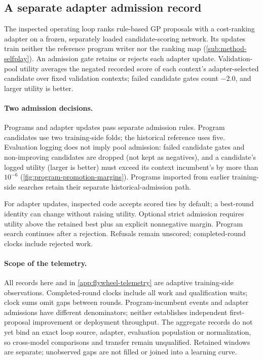 
\subsection{A separate adapter admission record}\label{sec:method-status}

The inspected operating loop ranks rule-based GP proposals with a cost-ranking adapter on a frozen, separately loaded candidate-scoring network. Its updates train neither the reference program writer nor the ranking map (\cref{sub:method-selfplay}). An admission gate retains or rejects each adapter update.
Validation-pool utility averages the negated recorded score of each context's adapter-selected candidate over fixed validation contexts; failed candidate gates count $-2.0$, and larger utility is better.



\paragraph{Two admission decisions.}
Programs and adapter updates pass separate admission rules. Program candidates use two training-side folds; the historical reference
uses five. Evaluation logging does not imply pool admission: failed candidate gates
and non-improving candidates are dropped (not kept as negatives), and
a candidate's logged utility (larger is better) must exceed its context incumbent's by more than $10^{-6}$
(\cref{fig:program-promotion-margins}). Programs imported from earlier training-side searches retain
their separate historical-admission path.

For adapter updates, inspected code accepts scored ties by default; a best-round identity
can change without raising utility. Optional strict admission requires
utility above the retained best plus an explicit nonnegative margin.
Program search continues after a rejection.
Refusals remain unscored; completed-round clocks include rejected work.

\paragraph{Scope of the telemetry.}
All records here and in \cref{app:flywheel-telemetry} are adaptive
training-side observations. Completed-round clocks include all work and
qualification waits; clock sums omit gaps between rounds. Program-incumbent
events and adapter admissions
have different denominators; neither establishes independent first-proposal
improvement or deployment throughput. The aggregate records do not yet bind
an exact loop source, adapter, evaluation population or normalization, so
cross-model comparisons and transfer remain unqualified. Retained windows
are separate; unobserved gaps are not filled or joined into a learning curve.



